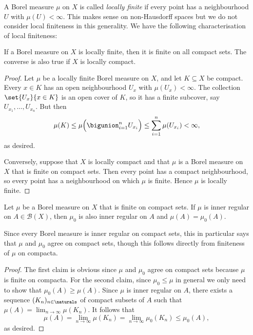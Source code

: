 \documentclass[article, a4paper, 11pt, oneside]{memoir}
\numberwithin{equation}{chapter}
\newcommand{\calB}{\mathcal{B}}
\newcommand{\borel}[1]{\calB(#1)}
\begin{document}
A Borel measure $\mu$ on $X$ is called \emph{locally finite} if every point has a neighbourhood $U$ with $\mu(U) < \infty$. This makes sense on non-Hausdorff spaces but we do not consider local finiteness in this generality. We have the following characterisation of local finiteness:

\begin{lemma}
    \label{thm:local-finiteness-compacts}
    If a Borel measure on $X$ is locally finite, then it is finite on all compact sets. The converse is also true if $X$ is locally compact.
\end{lemma}

\begin{proof}
    Let $\mu$ be a locally finite Borel measure on $X$, and let $K \subseteq X$ be compact. Every $x \in K$ has an open neighbourhood $U_x$ with $\mu(U_x) < \infty$. The collection $\set{U_x}{x \in K}$ is an open cover of $K$, so it has a finite subcover, say $U_{x_1}, \ldots, U_{x_n}$. But then
    \begin{equation*}
        \mu(K)
            \leq \mu \Bigl( \bigunion_{i=1}^n U_{x_i} \Bigr)
            \leq \sum_{i=1}^n \mu(U_{x_i})
            < \infty,
    \end{equation*}
    as desired.

    Conversely, suppose that $X$ is locally compact and that $\mu$ is a Borel measure on $X$ that is finite on compact sets. Then every point has a compact neighbourhood, so every point has a neighbourhood on which $\mu$ is finite. Hence $\mu$ is locally finite.
\end{proof}


\begin{proposition}
    \label{prop:semifinite-agree-on-inner-regular-sets}
    Let $\mu$ be a Borel measure on $X$ that is finite on compact sets. If $\mu$ is inner regular on $A \in \borel{X}$, then $\mu_0$ is also inner regular on $A$ and $\mu(A) = \mu_0(A)$.
\end{proposition}
%
Since every Borel measure is inner regular on compact sets, this in particular says that $\mu$ and $\mu_0$ agree on compact sets, though this follows directly from finiteness of $\mu$ on compacta.

\begin{proof}
    The first claim is obvious since $\mu$ and $\mu_0$ agree on compact sets because $\mu$ is finite on compacta. For the second claim, since $\mu_0 \leq \mu$ in general we only need to show that $\mu_0(A) \geq \mu(A)$. Since $\mu$ is inner regular on $A$, there exists a sequence $(K_n)_{n \in \naturals}$ of compact subsets of $A$ such that $\mu(A) = \lim_{n \to \infty} \mu(K_n)$. It follows that
    \begin{equation*}
        \mu(A)
            = \lim_{n \to \infty} \mu(K_n)
            = \lim_{n \to \infty} \mu_0(K_n)
            \leq \mu_0(A),
    \end{equation*}
    as desired.
\end{proof}
\end{document}
